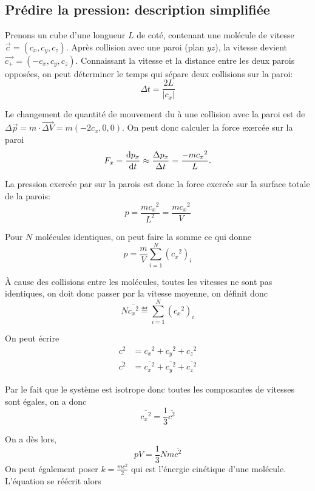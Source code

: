 \subsection{Prédire la pression: description simplifiée}
Prenons un cube d'une longueur $L$ de coté,
contenant une molécule de vitesse $\vec{c} = (c_x, c_y, c_z)$.
Après collision avec une paroi (plan $yz$),
la vitesse devient $\vec{c_+} = (-c_x, c_y, c_z)$.
Connaissant la vitesse et la distance entre les deux parois opposées,
on peut déterminer le temps qui sépare deux collisions sur la paroi:
\[ \Delta t = \frac{2L}{|c_x|} \]

Le changement de quantité de mouvement du à une collision avec
la paroi est de $\Delta \vec{p} = m \cdot \vec{\Delta V} = m(-2c_x, 0, 0)$.
On peut donc calculer la force exercée sur la paroi
\[ F_x = \frac{\operatorname{d}\! p_x}{\operatorname{d}\! t} \approx
\frac{\Delta p_x}{\Delta t} = \frac{-m{c_x}^2}{L}. \]

La pression exercée par  sur la parois est
donc la force exercée sur la surface totale de la parois:
\[ p = \frac{m{c_x}^2}{L^2} = \frac{m{c_x}^2}{V} \]

Pour $N$ molécules identiques, on peut faire la somme ce qui donne
\[ p = \frac{m}{V} \sum_{i=1}^{N}{({c_x}^2)_i} \]

À cause des collisions entre les molécules,
toutes les vitesses ne sont pas identiques,
on doit donc passer par la vitesse moyenne, on définit donc
\[ N \overline{{c_x}^2} \eqdef \sum_{i=1}^{N}{({c_x}^2)_i} \]

On peut écrire
\begin{align*}
  c^2 & = {c_x}^2 + {c_y}^2 + {c_z}^2\\
  \overline{c^2} & =
  \overline{{c_x}^2} + \overline{{c_y}^2} + \overline{{c_z}^2}
\end{align*}

Par le fait que le système est isotrope donc
toutes les composantes de vitesses sont égales, on a donc
\[  \overline{{c_x}^2} = \frac{1}{3}\overline{c^2} \]

On a dès lors,
\[ pV = \frac{1}{3}Nm\overline{c^2} \]
On peut également poser
$k = \frac{mc^2}{2}$ qui est l'énergie cinétique d'une molécule.
L'équation se réécrit alors


